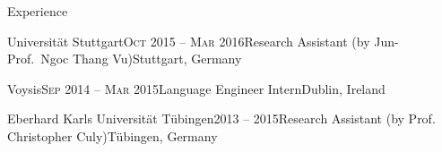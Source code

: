 \documentclass{resume} %
\begin{document}
\begin{rSection}{Experience}

\begin{rSubsection}{Universität Stuttgart}{\textsc{Oct} 2015 -- \textsc{Mar} 2016}{Research Assistant (by Jun-Prof.\ Ngoc Thang Vu)}{Stuttgart, Germany}
	\setlength{\itemindent}{.7cm}
	
	\item[]%
	
	\item[]%
	\vspace{-1cm}
\end{rSubsection}

\begin{rSubsection}{Voysis}{\textsc{Sep} 2014 -- \textsc{Mar} 2015}{Language Engineer Intern}{Dublin, Ireland}
	\setlength{\itemindent}{.7cm}
	
	\item[]%
	
	\item[]%
	\vspace{-1cm}
\end{rSubsection}

\begin{rSubsection}{Eberhard Karls Universität Tübingen}{2013 -- 2015}{Research Assistant (by Prof. Christopher Culy)}{Tübingen, Germany}
	\setlength{\itemindent}{.7cm}
	
	\item[]%
	
	\item[]%
	\vspace{-1cm}
\end{rSubsection}

%	
%	


\end{rSection}
\end{document}

